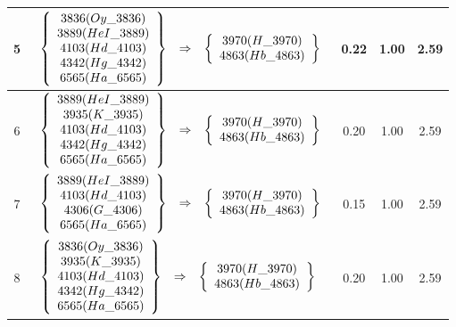 \begin{longtable}{| c | l | c | c | c |}
5 & $\begin{array}{c c c}\left\{\begin{array}{c}3836 (Oy\_3836) \\ 3889 (HeI\_3889) \\ 4103 (Hd\_4103) \\ 4342 (Hg\_4342) \\ 6565 (Ha\_6565)\end{array}\right\} & \Rightarrow & \left\{\begin{array}{c}3970 (H\_3970) \\ 4863 (Hb\_4863)\end{array}\right\}\end{array}$ & 0.22 & 1.00 & 2.59 \\ \hline
6 & $\begin{array}{c c c}\left\{\begin{array}{c}3889 (HeI\_3889) \\ 3935 (K\_3935) \\ 4103 (Hd\_4103) \\ 4342 (Hg\_4342) \\ 6565 (Ha\_6565)\end{array}\right\} & \Rightarrow & \left\{\begin{array}{c}3970 (H\_3970) \\ 4863 (Hb\_4863)\end{array}\right\}\end{array}$ & 0.20 & 1.00 & 2.59 \\ \hline
7 & $\begin{array}{c c c}\left\{\begin{array}{c}3889 (HeI\_3889) \\ 4103 (Hd\_4103) \\ 4306 (G\_4306) \\ 6565 (Ha\_6565)\end{array}\right\} & \Rightarrow & \left\{\begin{array}{c}3970 (H\_3970) \\ 4863 (Hb\_4863)\end{array}\right\}\end{array}$ & 0.15 & 1.00 & 2.59 \\ \hline
8 & $\begin{array}{c c c}\left\{\begin{array}{c}3836 (Oy\_3836) \\ 3935 (K\_3935) \\ 4103 (Hd\_4103) \\ 4342 (Hg\_4342) \\ 6565 (Ha\_6565)\end{array}\right\} & \Rightarrow & \left\{\begin{array}{c}3970 (H\_3970) \\ 4863 (Hb\_4863)\end{array}\right\}\end{array}$ & 0.20 & 1.00 & 2.59 \\ \hline

\end{longtable}
